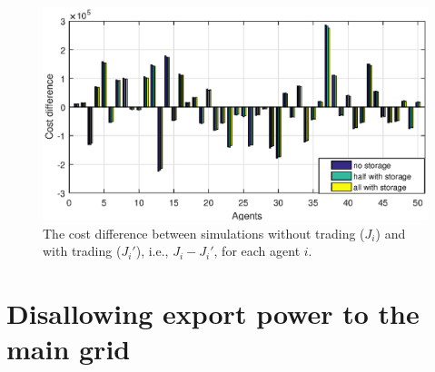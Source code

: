 \documentclass[10pt]{article}
\newtheorem{definitiox	n}{Definition}{\it}{}
\newcommand{\0}{\mathbf{0}}
\newcommand{\1}{\mathbf{1}}
\begin{document}
\begin{figure}[h]
	\centering
	\includegraphics[width=1\linewidth]{simA_cost.eps}
	\caption{The cost difference between simulations without trading ($J_i$) and with trading ($J_i'$), i.e., $J_i-J_i'$, for each agent $i$.}
\end{figure}

\section{Disallowing export power to the main grid}
\end{document}
